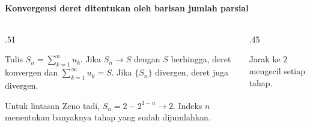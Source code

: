 \documentclass{../../kalkulus-ppt}
\begin{document}
\begin{frame}{\insertsection}
    \framesubtitle{Konvergensi deret ditentukan oleh barisan jumlah parsial}
    \begin{columns}[c,onlytextwidth]
        \begin{column}{.51\textwidth}
            \begin{definisi}
                Tulis $S_n=\sum_{k=1}^{n}u_k$.
                Jika $S_n\to S$ dengan $S$ berhingga, deret
                konvergen dan $\sum_{k=1}^{\infty}u_k=S$.
                Jika $\{S_n\}$ divergen, deret juga divergen.
            \end{definisi}
            Untuk lintasan Zeno tadi,
            $S_n=2-2^{1-n}\to2$. Indeks $n$ menentukan
            banyaknya tahap yang sudah dijumlahkan.
        \end{column}
        \begin{column}{.45\textwidth}
            \centering
            \par
            \small Jarak ke $2$ mengecil setiap tahap.
        \end{column}
    \end{columns}
\end{frame}
\end{document}
